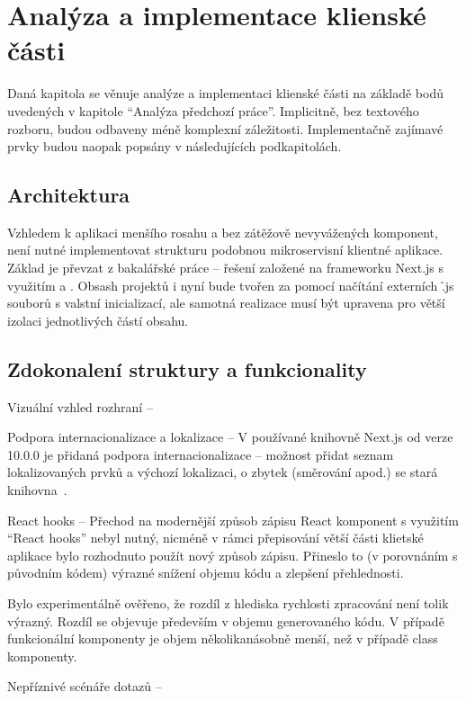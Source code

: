 \chapter{Analýza a implementace klienské části}\label{ch:client}

Daná kapitola se věnuje analýze a implementaci klienské části na základě bodů uvedených v kapitole \enquote{Analýza předchozí práce}.
Implicitně, bez textového rozboru, budou odbaveny méně komplexní záležitosti.
Implementačně zajímavé prvky budou naopak popsány v následujících podkapitolách.



\section{Architektura}\label{sec:client-arch}

Vzhledem k aplikaci menšího rosahu a bez zátěžově nevyvážených komponent, není nutné implementovat strukturu podobnou mikroservisní klientné aplikace.
Základ je převzat z bakalářské práce – řešení založené na frameworku Next.js s využitím  a .
Obsash projektů i nyní bude tvořen za pomocí načítání externích \h{.js} souborů s valstní inicializací, ale samotná realizace musí být upravena pro větší izolaci jednotlivých částí obsahu.

\section{Zdokonalení struktury a funkcionality}\label{sec:client-improve}




\begin{dl}
   \item[Vizuální vzhled rozhraní] –
   \item[Podpora internacionalizace a lokalizace] – V používané knihovně Next.js od verze 10.0.0 je přidaná podpora internacionalizace – možnost přidat seznam lokalizovaných prvků a výchozí lokalizaci, o zbytek (směrování apod.) se stará knihovna~\cite{nextjsi18n}.
   \item[React hooks] –
   Přechod na modernější způsob zápisu React komponent s využitím \enquote{React hooks} nebyl nutný, nicméně v rámci přepisování větší části klietské aplikace bylo rozhodnuto použít nový způsob zápisu.
   Přineslo to (v porovnáním s původním kódem) výrazné snížení objemu kódu a zlepšení přehlednosti.

   Bylo experimentálně ověřeno, že rozdíl z hlediska rychlosti zpracování není tolik výrazný.
   Rozdíl se objevuje především v objemu generovaného kódu.
   V případě funkcionální komponenty je objem několikanásobně menší, než v případě class komponenty.~\cite{reacthooksdiff}

   \item[Nepříznivé scénáře \g{API} dotazů] – 
\end{dl}





